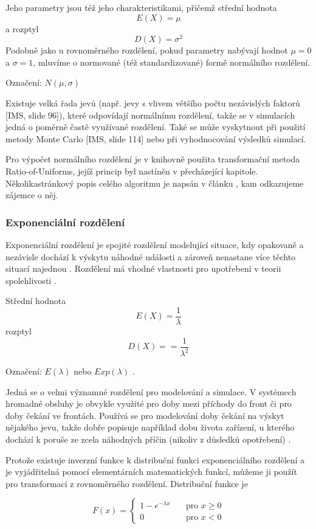 \documentclass[a4paper,11pt]{article}
\begin{document}
Jeho parametry jsou též jeho charakteristikami, přičemž střední hodnota $$E(X) = \mu$$ a rozptyl $$D(X) = \sigma^2$$Podobně jako u rovnoměrného rozdělení, pokud parametry nabývají hodnot $\mu = 0$ a $\sigma=1$, mluvíme o normované (též standardizované) formě normálního rozdělení. \cite{INM}

Označení: $N(\mu, \sigma)$

Existuje velká řada jevů (např. jevy s vlivem většího počtu nezávislých faktorů [IMS, slide 96]), které odpovídají normálnímu rozdělení, takže se v simulacích jedná o poměrně častě využívané rozdělení. Také se může vyskytnout při použití metody Monte Carlo [IMS, slide 114] nebo při vyhodnocování výsledků simulací.

Pro výpočet normálního rozdělení je v knihovně použita transformační metoda Ratio-of-Uniforms, jejíž princip byl nastíněn v přecházející kapitole. Několikastránkový popis celého algoritmu je napsán v článku \cite{Leva}, kam odkazujeme zájemce o něj.

\subsubsection{Exponenciální rozdělení}

Exponenciální rozdělení je spojité rozdělení modelující situace, kdy opakovaně a nezávisle dochází k výskytu náhodné události a zároveň nenastane více těchto situací najednou \cite{INM}. Rozdělení má vhodné vlastnosti pro upotřebení v teorii spolehlivosti \cite{IASTAT}.

Střední hodnota $$E(X) = \frac{1}{\lambda}$$ rozptyl $$D(X) = =\frac{1}{\lambda^2}$$

Označení: $E(\lambda)$ nebo $Exp(\lambda)$ \cite{INM}.

Jedná se o velmi významné rozdělení pro modelování a simulace. V systémech hromadné obsluhy je  obvykle využité pro doby mezi příchody do front či pro doby čekání ve frontách. Používá se pro modelování doby čekání na výskyt nějakého jevu, takže dobře popisuje například dobu života zařízení, u kterého dochází k poruše ze zcela náhodných příčin (nikoliv z důsledků opotřebení) \cite{IASTAT}.

Protože existuje inverzní funkce k distribuční funkci exponenciálního rozdělení a je vyjádřitelná pomocí elementárních matematických funkcí, můžeme ji použít pro transformaci z rovnoměrného rozdělení. Distribuční funkce je 

$$
{F(x)} = \left\{
\begin{array}{ll}
 1 - e ^{-\lambda x} & \quad\text{pro } x \geq 0  \\
 0 & \quad\text{pro } x < 0
\end{array}
\right.
$$
\end{document}
